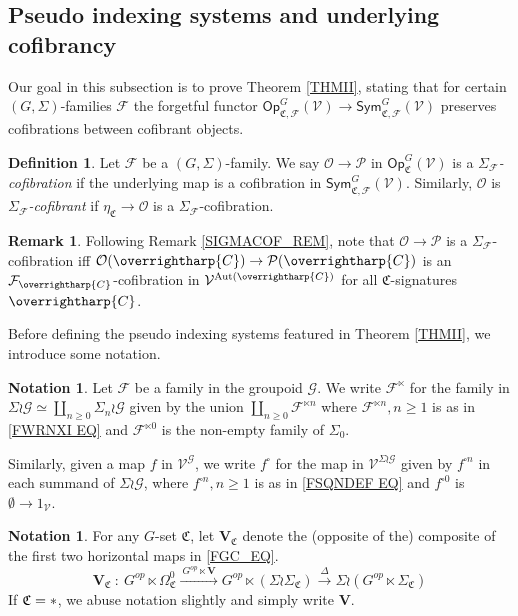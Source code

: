 \documentclass[a4paper,10pt
,draft
]{article}%
\numberwithin{equation}{section}
\numberwithin{figure}{section}
\theoremstyle{definition} %
\newtheorem{definition}[equation]{Definition}%
\newtheorem{remark}[equation]{Remark}%
\newtheorem{notation}[equation]{Notation}%
\newcommand{\vect}[1]{\text{\overrightharp{\ensuremath{#1}}}}
\newcommand{\Sym}{\ensuremath{\mathsf{Sym}}}%
\newcommand{\Op}{\mathsf{Op}}%
\DeclareMathOperator{\Aut}{Aut}%
\newcommand{\F}{\ensuremath{\mathcal F}}
\newcommand{\V}{\ensuremath{\mathcal V}}
\renewcommand{\O}{\ensuremath{\mathcal O}}
\renewcommand{\P}{\ensuremath{\mathcal P}}
\newcommand{\G}{\ensuremath{\mathcal G}}
\newcommand{\1}{\ensuremath{\mathbbm 1}}%
\begin{document}
\subsection{Pseudo indexing systems and underlying cofibrancy}
\label{INDSYS SEC}


Our goal in this subsection is to prove Theorem \ref{THMII},
stating that 
for certain $(G,\Sigma)$-families $\F$
the forgetful functor
$\Op^G_{\mathfrak C, \F}(\V) \to \Sym^G_{\mathfrak C, \F}(\V)$ preserves cofibrations between cofibrant objects.



\begin{definition}
Let $\F$ be a $(G,\Sigma)$-family.
We say $\O \to \P$ in $\Op^G_{\mathfrak C}(\V)$
      is a \textit{$\Sigma_\F$-cofibration}
      if the underlying map is a cofibration in $\Sym^G_{\mathfrak C, \F}(\V)$.
      Similarly, $\O$ is \textit{$\Sigma_\F$-cofibrant} if $\eta_{\mathfrak C} \to \O$ is a $\Sigma_\F$-cofibration.
\end{definition}


\begin{remark}
	Following Remark \ref{SIGMACOF_REM}, 
	note that 
	$\O \to \P$ is a $\Sigma_\F$-cofibration iff 
	$\O(\vect C) \to \P(\vect C)$ is an $\mathcal F_{\vect C}$-cofibration in $\V^{\Aut(\vect C)}$
	for all $\mathfrak C$-signatures $\vect C$.
\end{remark} 


Before defining the pseudo indexing systems featured in Theorem \ref{THMII},
we introduce some notation.


\begin{notation}\label{FSQUARE_NOT}
	Let $\F$ be a family in the groupoid $\G$.
	We write $\F^{\ltimes}$
	for the family in 
	$\Sigma \wr \G \simeq \coprod_{n \geq 0} \Sigma_{n} \wr \G$
	given by the union
	$\coprod_{n \geq 0} \F^{\ltimes n}$
	where $\F^{\ltimes n},n\geq 1$
	is as in \eqref{FWRNXI EQ}
	and $\F^{\ltimes 0}$ is the non-empty family of $\Sigma_0$.

	
	Similarly, given a map $f$ in $\V^{\mathcal G}$, 
	we write $f^{\square}$ for the map in $\V^{\Sigma \wr \mathcal G}$
	given by $f^{\square n}$ in each summand of $\Sigma \wr \mathcal{G}$,
	where $f^{\square n},n\geq 1$ is as in \eqref{FSQNDEF EQ}
	and $f^{\square 0}$ is $\emptyset \to 1_{\V}$.
\end{notation}

   

\begin{notation}
For any $G$-set $\mathfrak C$, let $\boldsymbol{V}_{\mathfrak C}$ denote the (opposite of the) composite of the first two horizontal maps in \eqref{FGC_EQ}.
\begin{equation}\label{VC_EQ}
	\boldsymbol{V}_{\mathfrak{C}} \ \colon \ 
	G^{op} \ltimes \Omega_{\mathfrak{C}}^{0}
	\xrightarrow{\ G^{op} \ltimes \boldsymbol{V} \ }
	G^{op} \ltimes \left(\Sigma \wr \Sigma_{\mathfrak{C}}\right)
	\xrightarrow{\ \Delta \ }
	\Sigma \wr  \left(G^{op} \ltimes \Sigma_{\mathfrak{C}} \right)
\end{equation}
If $\mathfrak C = \**$, we abuse notation slightly and simply write $\boldsymbol{V}$. 
\end{notation}
\end{document}
